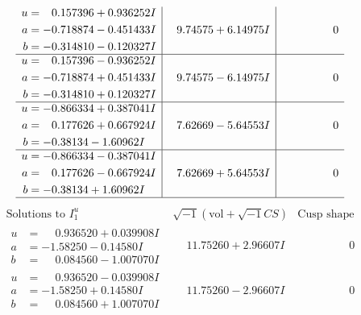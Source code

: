 \documentclass[1p]{elsarticle_modified}
\theoremstyle{definition}
\newcommand{\I}{\sqrt{-1}}
\begin{document}
$$\begin{array}{c|c|c}
\begin{aligned}
u &= \phantom{-}0.157396 + 0.936252 I \\
a &= -0.718874 - 0.451433 I \\
b &= -0.314810 - 0.120327 I\end{aligned}
 & \phantom{-}9.74575 + 6.14975 I & \phantom{-0.000000 } 0 \\ \hline\begin{aligned}
u &= \phantom{-}0.157396 - 0.936252 I \\
a &= -0.718874 + 0.451433 I \\
b &= -0.314810 + 0.120327 I\end{aligned}
 & \phantom{-}9.74575 - 6.14975 I & \phantom{-0.000000 } 0 \\ \hline\begin{aligned}
u &= -0.866334 + 0.387041 I \\
a &= \phantom{-}0.177626 + 0.667924 I \\
b &= -0.38134 - 1.60962 I\end{aligned}
 & \phantom{-}7.62669 - 5.64553 I & \phantom{-0.000000 } 0 \\ \hline\begin{aligned}
u &= -0.866334 - 0.387041 I \\
a &= \phantom{-}0.177626 - 0.667924 I \\
b &= -0.38134 + 1.60962 I\end{aligned}
 & \phantom{-}7.62669 + 5.64553 I & \phantom{-0.000000 } 0\\
 \hline 
 \end{array}$$\newpage$$\begin{array}{c|c|c}  
\text{Solutions to }I^u_{1}& \I (\text{vol} + \sqrt{-1}CS) & \text{Cusp shape}\\
 \hline 
\begin{aligned}
u &= \phantom{-}0.936520 + 0.039908 I \\
a &= -1.58250 - 0.14580 I \\
b &= \phantom{-}0.084560 - 1.007070 I\end{aligned}
 & \phantom{-}11.75260 + 2.96607 I & \phantom{-0.000000 } 0 \\ \hline\begin{aligned}
u &= \phantom{-}0.936520 - 0.039908 I \\
a &= -1.58250 + 0.14580 I \\
b &= \phantom{-}0.084560 + 1.007070 I\end{aligned}
 & \phantom{-}11.75260 - 2.96607 I & \phantom{-0.000000 } 0 \\ \hline\begin{aligned}

\end{aligned}
\end{array}$$
\end{document}
